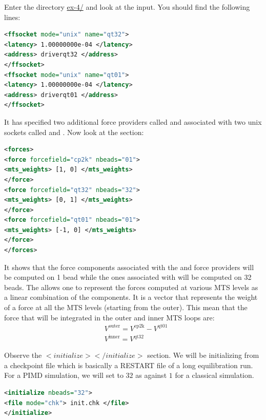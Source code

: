 \documentclass{article}
\begin{document}
\begin{Exercise}[label={water},title={Multiple time steps with an \emph{ab initio} potential}]
\Question
Enter the directory \url{ex-4/} and look at the \ipi{} input. You should find the following lines:
\begin{lstlisting}[language=xml]
<ffsocket mode="unix" name="qt32">
<latency> 1.00000000e-04 </latency>
<address> driverqt32 </address>
</ffsocket>
<ffsocket mode="unix" name="qt01">
<latency> 1.00000000e-04 </latency>
<address> driverqt01 </address>
</ffsocket>
\end{lstlisting}
It has specified two additional force providers called  and  associated with two unix sockets called  and . Now look at the  section:
\begin{lstlisting}[language=xml]
<forces>
<force forcefield="cp2k" nbeads="01">
<mts_weights> [1, 0] </mts_weights>
</force>
<force forcefield="qt32" nbeads="32">
<mts_weights> [0, 1] </mts_weights>
</force>
<force forcefield="qt01" nbeads="01">
<mts_weights> [-1, 0] </mts_weights>
</force>
</forces>
\end{lstlisting}
It shows that the force components associated with the  and  force providers will be computed on 1 bead while the ones associated with  will be computed on 32 beads. The  allows one to represent the forces computed at various MTS levels as a linear combination of the components. It is a vector that represents the weight of a force at all the MTS levels (starting from the outer). This mean that the force that will be integrated in the outer and inner MTS loops are:
\begin{align*}
    & V^{\text{outer}} = V^{\text{cp2k}} - V^{\text{qt01}} \\
    & V^{\text{inner}} = V^{\text{qt32}}
\end{align*}

\Question
Observe the \lstinxml$<initialize></initialize>$ section. We will be initializing from a checkpoint file 
 which is basically a RESTART file of a long equilibration run. 
For a PIMD simulation, we will set  to $32$ as against $1$ for a classical simulation.

\begin{lstlisting}[language=xml]
<initialize nbeads="32">  
<file mode="chk"> init.chk </file>
</initialize>
\end{lstlisting}


\end{Exercise}
\end{document}
